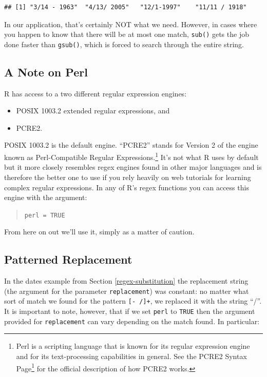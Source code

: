\documentclass[]{book}
\providecommand{\tightlist}{%
  \setlength{\itemsep}{0pt}\setlength{\parskip}{0pt}}
\let\rmarkdownfootnote\footnote%
\def\footnote{\protect\rmarkdownfootnote}
\renewcommand{\href}[2]{#2\footnote{\url{#1}}}
\renewcommand{\href}[2]{#2\footnote{\url{#1}}}
\theoremstyle{definition}
\theoremstyle{definition}
\theoremstyle{remark}
\begin{document}
{\begin{verbatim}
## [1] "3/14 - 1963"  "4/13/ 2005"   "12/1-1997"    "11/11 / 1918"
\end{verbatim}

In our application, that's certainly NOT what we need. However, in cases
where you happen to know that there will be at most one match,
\texttt{sub()} gets the job done faster than \texttt{gsub()}, which is
forced to search through the entire string.

\subsection{A Note on Perl}\label{a-note-on-perl}

R has access to a two different regular expression engines:

\begin{itemize}
\tightlist
\item
  POSIX 1003.2 extended regular expressions, and
\item
  PCRE2.
\end{itemize}

POSIX 1003.2 is the default engine. ``PCRE2'' stands for Version 2 of
the engine known as Perl-Compatible Regular Expressions.\footnote{Perl
  is a scripting language that is known for its regular expression
  engine and for its text-processing capabilities in general. See the
  \href{http://www.pcre.org/current/doc/html/pcre2syntax.html}{PCRE2
  Syntax Page} for the official description of how PCRE2 works.} It's
not what R uses by default but it more closely resembles regex engines
found in other major languages and is therefore the better one to use if
you rely heavily on web tutorials for learning complex regular
expressions. In any of R's regex functions you can access this engine
with the argument:

\begin{quote}
\texttt{perl\ =\ TRUE}
\end{quote}

From here on out we'll use it, simply as a matter of caution.

\subsection{Patterned Replacement}\label{patterned-replacement}

In the dates example from Section \ref{regex-substitution} the
replacement string (the argument for the parameter \texttt{replacement})
was constant: no matter what sort of match we found for the pattern
\texttt{{[}-\ /{]}+}, we replaced it with the string ``/''. It is
important to note, however, that if we set \texttt{perl} to
\texttt{TRUE} then the argument provided for \texttt{replacement} can
vary depending on the match found. In particular:

}
\end{document}
